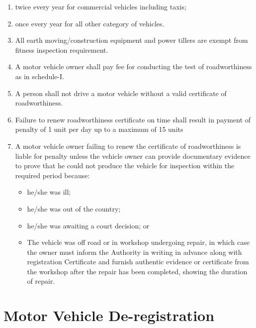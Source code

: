 \documentclass[
]{book}
\providecommand{\tightlist}{%
  \setlength{\itemsep}{0pt}\setlength{\parskip}{0pt}}
\begin{document}
\begin{enumerate}
\def\labelenumi{\alph{enumi}.}
\tightlist
\item
  twice every year for commercial vehicles including taxis;
\item
  once every year for all other category of vehicles.
\item
  All earth moving/construction equipment and power tillers are exempt from fitness inspection requirement.
\item
  A motor vehicle owner shall pay fee for conducting the test of roadworthiness as in schedule-I.
\item
  A person shall not drive a motor vehicle without a valid certificate of roadworthiness.
\item
  Failure to renew roadworthiness certificate on time shall result in payment of penalty of 1 unit per day up to a maximum of 15 units
\item
  A motor vehicle owner failing to renew the certificate of roadworthiness is liable for penalty unless the vehicle owner can provide documentary evidence to prove that he could not produce the vehicle for inspection within the required period because:

  \begin{itemize}
  \tightlist
  \item
    he/she was ill;
  \item
    he/she was out of the country;
  \item
    he/she was awaiting a court decision; or
  \item
    The vehicle was off road or in workshop undergoing repair, in which case the owner must inform the Authority in writing in advance along with registration Certificate and furnish authentic evidence or certificate from the workshop after the repair has been completed, showing the duration of repair.
  \end{itemize}
\end{enumerate}

\hypertarget{motor-vehicle-de-registration}{%
\section{Motor Vehicle De-registration}\label{motor-vehicle-de-registration}}
\end{document}
